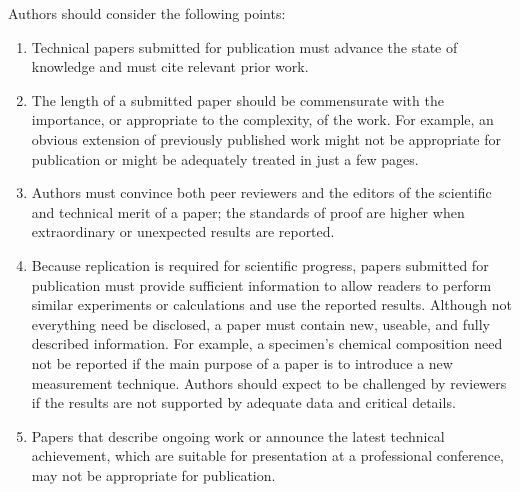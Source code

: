 \documentclass[journal,twoside,web]{ieeecolor}
\begin{document}
Authors should consider the following points:

\begin{enumerate}
\item Technical papers submitted for publication must advance the state of knowledge and must cite relevant prior work. 
\item The length of a submitted paper should be commensurate with the importance, or appropriate to the complexity, of the work. For example, an obvious extension of previously published work might not be appropriate for publication or might be adequately treated in just a few pages.
\item Authors must convince both peer reviewers and the editors of the scientific and technical merit of a paper; the standards of proof are higher when extraordinary or unexpected results are reported. 
\item Because replication is required for scientific progress, papers submitted for publication must provide sufficient information to allow readers to perform similar experiments or calculations and 
use the reported results. Although not everything need be disclosed, a paper 
must contain new, useable, and fully described information. For example, a 
specimen's chemical composition need not be reported if the main purpose of 
a paper is to introduce a new measurement technique. Authors should expect 
to be challenged by reviewers if the results are not supported by adequate 
data and critical details.
\item Papers that describe ongoing work or announce the latest technical achievement, which are suitable for presentation at a professional conference, may not be appropriate for publication.
\end{enumerate}




\end{document}
